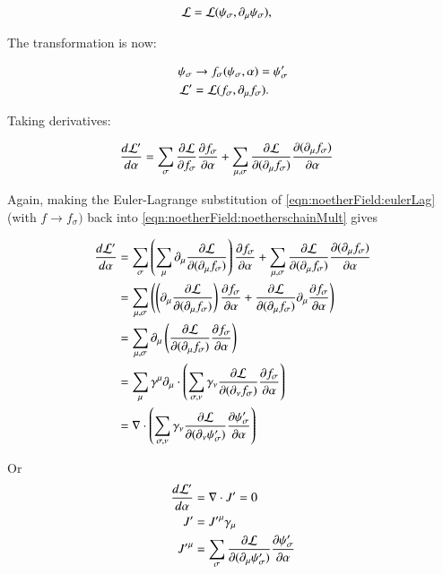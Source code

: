 \begin{align*}
\mathcal{L} &= \mathcal{L}(\psi_\sigma, \partial_\mu \psi_\sigma),
\end{align*}

The transformation is now:

\begin{align*}
\psi_\sigma &\rightarrow f_\sigma(\psi_\sigma, \alpha) = \psi_\sigma' \\
\mathcal{L}' &= \mathcal{L}(f_\sigma, \partial_\mu f_\sigma).
\end{align*}

Taking derivatives:

\begin{align}\label{eqn:noetherField:noetherschainMult}
\frac{d\mathcal{L}'}{d\alpha}
&= \sum_\sigma \frac{\partial {\mathcal{L}}}{\partial {f_\sigma}}\frac{\partial {f_\sigma}}{\partial {\alpha}} + \sum_{\mu,\sigma} \frac{\partial {\mathcal{L}}}{\partial {(\partial_\mu f_\sigma)}}\frac{\partial {(\partial_\mu f_\sigma)}}{\partial {\alpha}}
\end{align}

Again, making the Euler-Lagrange substitution of \ref{eqn:noetherField:eulerLag} (with $f\rightarrow f_\sigma)$ back into \ref{eqn:noetherField:noetherschainMult} gives

\begin{align*}
\frac{d\mathcal{L}'}{d\alpha}
&= 
\sum_\sigma \left( \sum_\mu \partial_\mu \frac{\partial {\mathcal{L}}}{\partial {(\partial_\mu f_\sigma)}}\right)
\frac{\partial {f_\sigma}}{\partial {\alpha}} + \sum_{\mu,\sigma} \frac{\partial {\mathcal{L}}}{\partial {(\partial_\mu f_\sigma)}}\frac{\partial {(\partial_\mu f_\sigma)}}{\partial {\alpha}} \\
&= 
\sum_{\mu,\sigma} \left( \left( \partial_\mu \frac{\partial {\mathcal{L}}}{\partial {(\partial_\mu f_\sigma)}} \right)
\frac{\partial {f_\sigma}}{\partial {\alpha}} + \frac{\partial {\mathcal{L}}}{\partial {(\partial_\mu f_\sigma)}} \partial_\mu \frac{\partial {f_\sigma}}{\partial {\alpha}} \right) \\
&= \sum_{\mu,\sigma} \partial_\mu \left( \frac{\partial {\mathcal{L}}}{\partial {(\partial_\mu f_\sigma)}} \frac{\partial {f_\sigma}}{\partial {\alpha}} \right) \\
&= \sum_\mu \gamma^\mu \partial_\mu \cdot \left( \sum_{\sigma,\nu} \gamma_\nu \frac{\partial {\mathcal{L}}}{\partial {(\partial_\nu f_\sigma)}} \frac{\partial {f_\sigma}}{\partial {\alpha}} \right) \\
&= \nabla \cdot \left( \sum_{\sigma,\nu} \gamma_\nu \frac{\partial {\mathcal{L}}}{\partial {(\partial_\nu \psi_\sigma')}} \frac{\partial {\psi_\sigma'}}{\partial {\alpha}} \right) \\
\end{align*}

Or
\begin{align}\label{eqn:noetherField:conCurrent}
\frac{d \mathcal{L}'}{d\alpha} &= \nabla \cdot J' = 0 \\
J' &= {J'}^\mu \gamma_\mu \\
{J'}^\mu &= \sum_\sigma \frac{\partial {\mathcal{L}}}{\partial {(\partial_\mu \psi_\sigma')}} \frac{\partial {\psi_\sigma'}}{\partial {\alpha}} 
\end{align}

